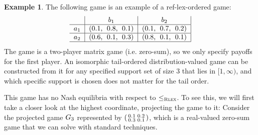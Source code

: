 \documentclass[a4paper]{scrreprt}
\theoremstyle{definition}
\newtheorem{ex}[thm]{Example} %
\begin{document}
    \begin{ex}
        \label{ex:reflectedLexicographicallyOrderedGameWithoutEquilibria}
        The following game is an example of a ref-lex-ordered game:
        \begin{gather}
            \centering
            \begin{tabular}{c|c|c|}
            	      &        $b_1$        &        $b_2$        \\ \hline
            	$a_1$ & (0.1,\; 0.8,\; 0.1) & (0.1,\; 0.7,\; 0.2) \\ \hline
            	$a_2$ & (0.6,\; 0.1,\; 0.3) & (0.8,\; 0.1,\; 0.1) \\ \hline
            \end{tabular}
        \end{gather}
        The game is a two-player matrix game (i.e. zero-sum), so we only specify payoffs for the first player.
        An isomorphic tail-ordered distribution-valued game can be constructed from it for any specified support set of size 3 that lies in $[1, \infty)$,
        and which specific support is chosen does not matter for the tail order.
        
        This game has no Nash equilibria with respect to $\leq_{\textsc{Rlex}}$.
        To see this, we will first take a closer look at the highest coordinate, projecting the game to it: Consider the projected game
        $G_{3}$ represented by $\left(\begin{smallmatrix}0.1 & 0.2 \\ 0.3 & 0.1\end{smallmatrix}\right)$, which is a real-valued zero-sum game that we can solve with standard techniques.
        

\end{ex}
\end{document}
